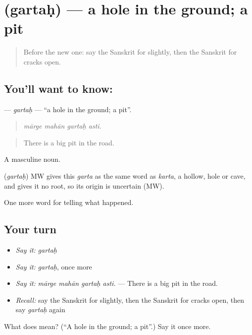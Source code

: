 \section[\texorpdfstring{\sk{गर्तः} (gartaḥ)}{गर्तः (gartaḥ)}]{ (gartaḥ) — a hole in the ground; a pit}

\label{lesson:SA-C300-gartah}



\begin{quote}
Before the new one: say the Sanskrit for slightly, then the Sanskrit for cracks open.
\end{quote}

\subsection*{You'll want to know: }
\textbf{} — \emph{gartaḥ} — \textquotedblleft{}a hole in the ground; a pit\textquotedblright{}.

\begin{quote}
   
\end{quote}

\begin{quote}
\emph{mārge mahān gartaḥ asti.}
\end{quote}

\begin{quote}
There is a big pit in the road.
\end{quote}

A masculine noun.

\begin{cousinweb}
\textbf{} (\emph{gartaḥ}) MW gives this \emph{garta} as the same word as \emph{karta}, a hollow, hole or cave, and gives it no root, so its origin is uncertain (MW).
\end{cousinweb}

\begin{grammarlens}[title={What you've built}]
One more word for telling what happened.
\end{grammarlens}

\subsection*{Your turn}
\begin{itemize}
\raggedright
  \item \emph{Say it:} \emph{gartaḥ}
  \item \emph{Say it:} \emph{gartaḥ}, once more
  \item \emph{Say it:} \emph{mārge mahān gartaḥ asti.} — There is a big pit in the road.
  \item \emph{Recall:} say the Sanskrit for slightly, then the Sanskrit for cracks open, then say \emph{gartaḥ} again
\end{itemize}

\begin{tcolorbox}[breakable,colback=teal!4,colframe=teal!35!black,title={Before you move on}]
What does  mean? (\textquotedblleft{}A hole in the ground; a pit\textquotedblright{}.) Say it once more.
\end{tcolorbox}
